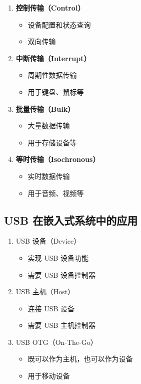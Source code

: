 \begin{enumerate}
  \item \textbf{控制传输（Control）}
    \begin{itemize}
      \item 设备配置和状态查询
      \item 双向传输
    \end{itemize}

  \item \textbf{中断传输（Interrupt）}
    \begin{itemize}
      \item 周期性数据传输
      \item 用于键盘、鼠标等
    \end{itemize}

  \item \textbf{批量传输（Bulk）}
    \begin{itemize}
      \item 大量数据传输
      \item 用于存储设备等
    \end{itemize}

  \item \textbf{等时传输（Isochronous）}
    \begin{itemize}
      \item 实时数据传输
      \item 用于音频、视频等
    \end{itemize}
\end{enumerate}

\subsection{USB 在嵌入式系统中的应用}

\begin{enumerate}
  \item USB 设备（Device）
    \begin{itemize}
      \item 实现 USB 设备功能
      \item 需要 USB 设备控制器
    \end{itemize}

  \item USB 主机（Host）
    \begin{itemize}
      \item 连接 USB 设备
      \item 需要 USB 主机控制器
    \end{itemize}

  \item USB OTG（On-The-Go）
    \begin{itemize}
      \item 既可以作为主机，也可以作为设备
      \item 用于移动设备
    \end{itemize}
\end{enumerate}

